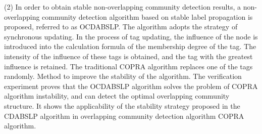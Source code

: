 \begin{englishabstract}
(2) In order to obtain stable non-overlapping community detection results, a non-overlapping community detection algorithm based on stable label propagation is proposed, referred to as OCDABSLP. The algorithm adopts the strategy of synchronous updating. In the process of tag updating, the influence of the node is introduced into the calculation formula of the membership degree of the tag. The intensity of the influence of these tags is obtained, and the tag with the greatest influence is retained. The traditional COPRA algorithm replaces one of the tags randomly. Method to improve the stability of the algorithm. The verification experiment proves that the OCDABSLP algorithm solves the problem of COPRA algorithm instability, and can detect the optimal overlapping community structure. It shows the applicability of the stability strategy proposed in the CDABSLP algorithm in overlapping community detection algorithm COPRA algorithm.
   

\end{englishabstract}
